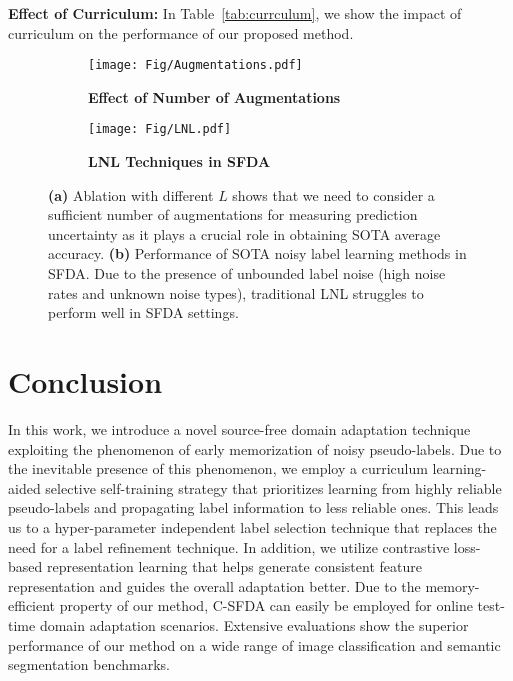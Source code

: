 \documentclass[10pt,twocolumn,letterpaper]{article}
\begin{document}
\vspace{0.6mm}
\noindent \textbf{Effect of Curriculum:} In Table~\ref{tab:currculum}, we show the impact of curriculum on the performance of our proposed method.


\begin{figure}[t]
  \centering
  \begin{subfigure}{0.5\linewidth}
    \texttt{[image: Fig/Augmentations.pdf]}
    \caption{\scriptsize \textbf{Effect of Number of Augmentations}}
    \label{fig:augme}
  \end{subfigure}
  \hfill
\begin{subfigure}{0.48\linewidth}
    \texttt{[image: Fig/LNL.pdf]}
    \caption{\scriptsize \textbf{LNL Techniques in SFDA}}
    \label{fig:LNL}
  \end{subfigure}
  \vspace{-1.5mm}
  \caption{\footnotesize \textbf{(a)} Ablation with different $L$ shows that we need to consider a sufficient number of augmentations for measuring prediction uncertainty as it plays a crucial role in obtaining SOTA average accuracy. \textbf{(b)} Performance of SOTA noisy label learning methods in SFDA. Due to the presence of unbounded label noise (\ie high noise rates and unknown noise types), traditional LNL struggles to perform well in SFDA settings.}
  \vspace{-3mm}
\end{figure}
\vspace{-1mm}
\section{Conclusion}
\vspace{-0.5mm}
In this work, we introduce a novel source-free domain adaptation technique exploiting the phenomenon of early memorization of noisy pseudo-labels. Due to the inevitable presence of this phenomenon, we employ a curriculum learning-aided selective self-training strategy that prioritizes learning from highly reliable pseudo-labels and propagating label information to less reliable ones. This leads us to a hyper-parameter independent label selection technique that replaces the need for a label refinement technique. In addition, we utilize contrastive loss-based representation learning that helps generate consistent feature representation and guides the overall adaptation better. Due to the memory-efficient property of our method, C-SFDA can easily be employed for online test-time domain adaptation scenarios. Extensive evaluations show the superior performance of our method on a wide range of image classification and semantic segmentation benchmarks.
\end{document}
